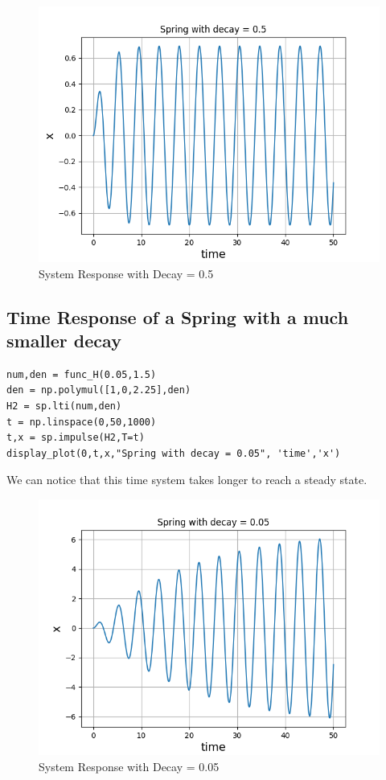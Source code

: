 \documentclass{article}
\begin{document}
\begin{figure}[h!]
\centering
\includegraphics[scale=0.52]{Figure_0}
\caption{System Response with Decay = 0.5}
\label{fig:System Response with Decay = 0.5}
\end{figure}


\subsection{Time Response of a Spring with a much smaller decay}


\begin{lstlisting}
num,den = func_H(0.05,1.5)
den = np.polymul([1,0,2.25],den)
H2 = sp.lti(num,den)
t = np.linspace(0,50,1000)
t,x = sp.impulse(H2,T=t)
display_plot(0,t,x,"Spring with decay = 0.05", 'time','x')
\end{lstlisting}
We can notice that this time system takes longer to reach a steady state.
\begin{figure}[h!]
\centering
\includegraphics[scale=0.52]{Figure_1}
\caption{System Response with Decay = 0.05}
\label{fig:System Response with Decay = 0.05}
\end{figure}
\end{document}
